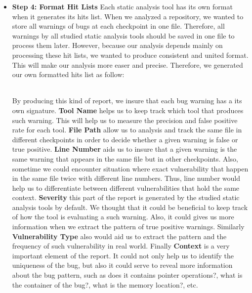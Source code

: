 \begin{itemize}[leftmargin=*]
\item \textbf{ Step 4: Format Hit Lists}
Each static analysis tool has its own format when it generates its hits list. When we analyzed a repository, we wanted to store all warnings of bugs at each checkpoint in one file.  Therefore, all warnings by all studied static analysis tools should be saved in one file to process them later. However, because our analysis depends mainly on processing these hit lists, we wanted to produce consistent and united format. This will make our analysis more easer and precise. Therefore, we generated our own formatted hits list as follow:
\newline

\\

By producing this kind of report, we insure that each bug warning has a its own signature.  \textbf{Tool Name} helps us to keep track which tool that produces such warning. This will help us to measure the precision and false positive rate for each tool.  \textbf{File Path} allow us to analysis and track the same file in different checkpoints in order to decide whether a given warning is false or true positive.  
\textbf{Line Number}  aids  us to insure that a given warning  is the same warning that appears in the same file but in other checkpoints. Also, sometime we could encounter situation where exact vulnerability that happen in the same file twice with different line numbers. Thus, line number would help us to differentiate between different vulnerabilities that hold the same context.  \textbf{Severity} this part of the report is generated by the studied static analysis tools by default. We thought that it could be beneficial to keep track of how the tool is evaluating a such  warning. Also, it could gives us more information when we extract the pattern of true positive warnings. Similarly \textbf{Vulnerability Type} also would aid us  to extract the pattern and the frequency of such vulnerability in real world. Finally  
\textbf{Context} is a very important element of the report. It could not only  help us to identify the uniqueness of the bug, but also it could serve  to reveal more information about the bug pattern, such as does it contains pointer operations?, what is the container of the bug?, what is the memory location?, etc.
 

\end{itemize}
